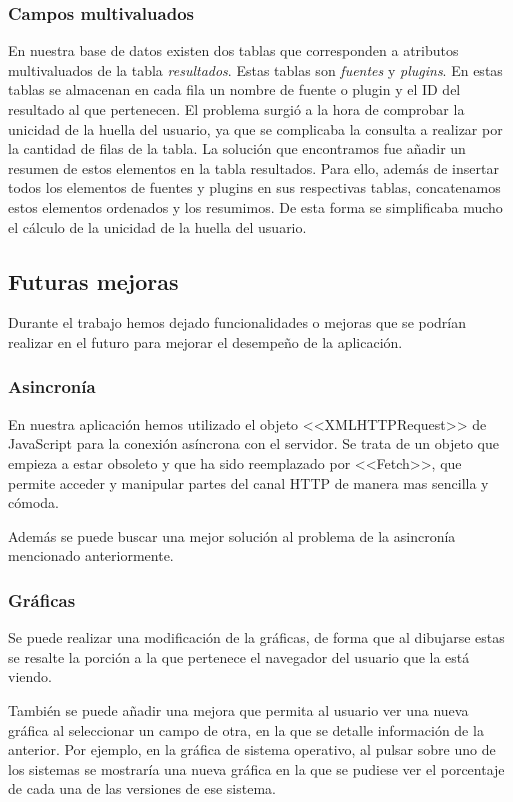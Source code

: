 \subsubsection{Campos multivaluados}
En nuestra base de datos existen dos tablas que corresponden a atributos multivaluados de la tabla \textit{resultados}. Estas tablas son \textit{fuentes} y \textit{plugins}. En estas tablas se almacenan en cada fila un nombre de fuente o plugin y el ID del resultado al que pertenecen. El problema surgió a la hora de comprobar la unicidad de la huella del usuario, ya que se complicaba la consulta a realizar por la cantidad de filas de la tabla. La solución que encontramos fue añadir un resumen de estos elementos en la tabla resultados. Para ello, además de insertar todos los elementos de fuentes y plugins en sus respectivas tablas, concatenamos estos elementos ordenados y los resumimos. De esta forma se simplificaba mucho el cálculo de la unicidad de la huella del usuario.
\subsection{Futuras mejoras}
Durante el trabajo hemos dejado funcionalidades o mejoras que se podrían realizar en el futuro para mejorar el desempeño de la aplicación.
\subsubsection{Asincronía}
En nuestra aplicación hemos utilizado el objeto <<XMLHTTPRequest>> de JavaScript para la conexión asíncrona con el servidor. Se trata de un objeto que empieza a estar obsoleto y que ha sido reemplazado por <<Fetch>>, que permite acceder y manipular partes del canal HTTP de manera mas sencilla y cómoda.\par 
Además se puede buscar una mejor solución al problema de la asincronía mencionado anteriormente.
\subsubsection{Gráficas}
Se puede realizar una modificación de la gráficas, de forma que al dibujarse estas se resalte la porción a la que pertenece el navegador del usuario que la está viendo.\par 
También se puede añadir una mejora que permita al usuario ver una nueva gráfica al seleccionar un campo de otra, en la que se detalle información de la anterior. Por ejemplo, en la gráfica de sistema operativo, al pulsar sobre uno de los sistemas se mostraría una nueva gráfica en la que se pudiese ver el porcentaje de cada una de las versiones de ese sistema.
